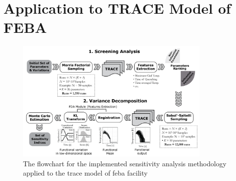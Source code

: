 \section{Application to TRACE Model of FEBA}\label{sec:sa_application_to_feba}


\begin{figure}
	\centering
	\includegraphics[width=0.85\textwidth]{../figures/sensitivityFlowchart/sensitivityFlowchart.png}
	\caption[The flowchart for the implemented sensitivity analysis methodology applied to the TRACE model of FEBA facility]{The flowchart for the implemented sensitivity analysis methodology applied to the \gls{trace} model of \gls{feba} facility}
	\label{fig:sensitivity_flowchart}
\end{figure}